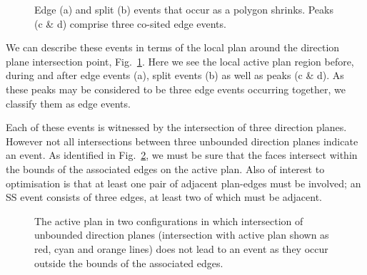 \begin{figure}
  \centering
  \def\svgwidth{1.0\columnwidth}
  
  \caption[Split and edge events]{\label{fig:skel_unweighted_intro} Edge (a) and split (b) events that occur as a polygon shrinks. Peaks (c \& d) comprise three co-sited edge events.}
\end{figure}


We can describe these events in terms of the local plan around the direction plane intersection point, Fig.~\ref{fig:skel_unweighted_intro}. Here we see the local active plan region before, during and after edge events (a), split events (b) as well as peaks (c \& d). As these peaks may be considered to be three edge events occurring together, we classify them as edge events.

Each of these events is witnessed by the intersection of three direction planes. However not all intersections between three unbounded direction planes indicate an event. As identified in Fig.~\ref{fig:skel_intersecting_planes}, we must be sure that the faces intersect within the bounds of the associated edges on the active plan. Also of interest to optimisation is that at least one pair of adjacent plan-edges must be involved; an SS event consists of three edges, at least two of which must be adjacent.

\begin{figure}
  \centering
  \def\svgwidth{0.85\columnwidth}
  
  \caption[Not all direction plane intersection are active plane events]{\label{fig:skel_intersecting_planes}The active plan in two configurations in which intersection of unbounded direction planes (intersection with active plan shown as red, cyan and orange lines) does not lead to an event as they occur outside the bounds of the associated edges.}
\end{figure}

